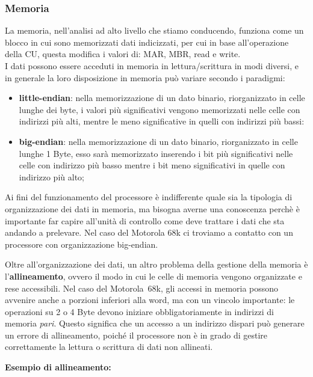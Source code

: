 \subsubsection{Memoria}
La memoria, nell'analisi ad alto livello che stiamo conducendo, funziona come un blocco in cui sono memorizzati dati indicizzati, per cui in base all'operazione della CU, questa modifica i valori di: MAR, MBR, read e write. \\
I dati possono essere acceduti in memoria in lettura/scrittura in modi diversi, e in generale la loro disposizione in memoria può variare secondo i paradigmi: 
\begin{itemize}
    \item \textbf{little-endian}: nella memorizzazione di un dato binario, riorganizzato in celle lunghe dei byte, i valori più significativi vengono memorizzati nelle celle con indirizzi più alti, mentre le meno significative in quelli con indirizzi più bassi:
    \item \textbf{big-endian}: nella memorizzazione di un dato binario, riorganizzato in celle lunghe 1 Byte, esso sarà memorizzato inserendo i bit più significativi nelle celle con indirizzo più basso mentre i bit meno significativi in quelle con indirizzo più alto;
\end{itemize}
Ai fini del funzionamento del processore è indifferente quale sia la tipologia di organizzazione dei dati in memoria, ma bisogna averne una conoscenza perchè è importante far capire all'unità di controllo come deve trattare i dati che sta andando a prelevare. Nel caso del Motorola 68k ci troviamo a contatto con un processore con organizzazione big-endian.

\vspace{1em}

Oltre all'organizzazione dei dati, un altro problema della gestione della memoria è \\
l'\textbf{allineamento}, ovvero il modo in cui le celle di memoria vengono organizzate e rese 
accessibili. Nel caso del Motorola~68k, gli accessi in memoria possono avvenire anche a porzioni 
inferiori alla word, ma con un vincolo importante: le operazioni su 2 o 4 Byte devono iniziare 
obbligatoriamente in indirizzi di memoria \emph{pari}. Questo significa che un accesso a un indirizzo 
dispari può generare un errore di allineamento, poiché il processore non è in grado di gestire 
correttamente la lettura o scrittura di dati non allineati.

\clearpage
\textbf{Esempio di allineamento:}

